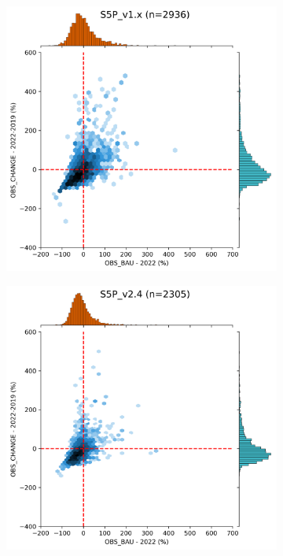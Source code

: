\begin{figure}[tbh!]
    \centering
    \begin{subfigure}{.5\textwidth}
      \centering
      \includegraphics[width=\textwidth]{figs/chap3/fig7_a.png}
      \caption{}
      \label{fig:fig7a}
    \end{subfigure}%
    \begin{subfigure}{.5\textwidth}
      \centering
      \includegraphics[width=\textwidth]{figs/chap3/fig7_b.png}

\end{subfigure}
\end{figure}
